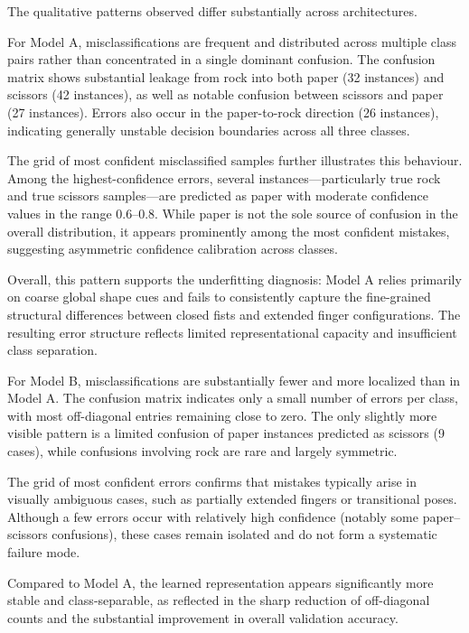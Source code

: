 \documentclass{article}
\begin{document}
The qualitative patterns observed differ substantially across
architectures.

For Model A, misclassifications are frequent and distributed across multiple 
class pairs rather than concentrated in a single dominant confusion. 
The confusion matrix shows substantial leakage from rock into both paper 
(32 instances) and scissors (42 instances), as well as notable confusion 
between scissors and paper (27 instances). Errors also occur in the 
paper-to-rock direction (26 instances), indicating generally unstable 
decision boundaries across all three classes.

The grid of most confident misclassified samples further illustrates this 
behaviour. Among the highest-confidence errors, several instances—particularly 
true rock and true scissors samples—are predicted as paper with moderate 
confidence values in the range 0.6–0.8. While paper is not the sole source 
of confusion in the overall distribution, it appears prominently among the 
most confident mistakes, suggesting asymmetric confidence calibration across 
classes.

Overall, this pattern supports the underfitting diagnosis: Model A relies 
primarily on coarse global shape cues and fails to consistently capture the 
fine-grained structural differences between closed fists and extended finger 
configurations. The resulting error structure reflects limited representational 
capacity and insufficient class separation.

For Model B, misclassifications are substantially fewer and more localized 
than in Model A. The confusion matrix indicates only a small number of 
errors per class, with most off-diagonal entries remaining close to zero. 
The only slightly more visible pattern is a limited confusion of paper 
instances predicted as scissors (9 cases), while confusions involving rock 
are rare and largely symmetric.

The grid of most confident errors confirms that mistakes typically arise 
in visually ambiguous cases, such as partially extended fingers or 
transitional poses. Although a few errors occur with relatively high 
confidence (notably some paper–scissors confusions), these cases remain 
isolated and do not form a systematic failure mode.

Compared to Model A, the learned representation appears significantly more 
stable and class-separable, as reflected in the sharp reduction of 
off-diagonal counts and the substantial improvement in overall validation 
accuracy.
\end{document}
